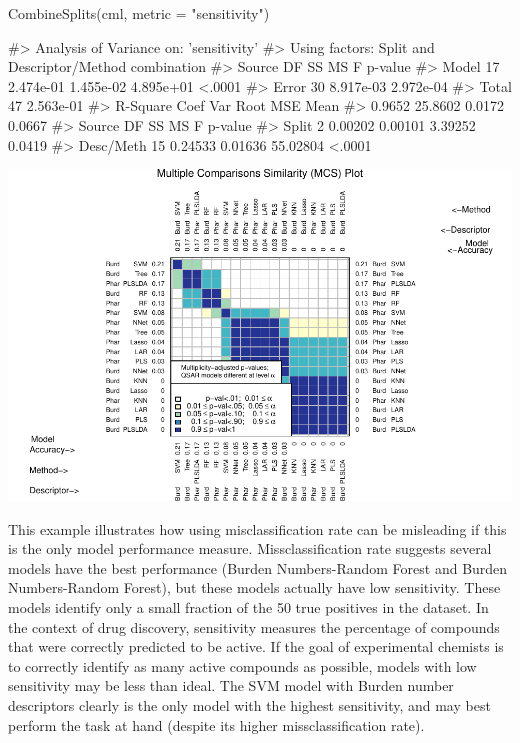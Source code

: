 \begin{Schunk}
\begin{Sinput}
CombineSplits(cml, metric = "sensitivity")
\end{Sinput}
\begin{Soutput}
#>    Analysis of Variance on: 'sensitivity'
#>  Using factors: Split and Descriptor/Method combination
#> Source    DF          SS          MS           F   p-value   
#> Model     17   2.474e-01   1.455e-02   4.895e+01    <.0001   
#> Error     30   8.917e-03   2.972e-04   
#> Total     47   2.563e-01   
#>       R-Square   Coef Var   Root MSE       Mean   
#>         0.9652    25.8602     0.0172     0.0667   
#> Source       DF         SS         MS          F   p-value   
#> Split         2    0.00202    0.00101    3.39252    0.0419   
#> Desc/Meth    15    0.24533    0.01636   55.02804    <.0001
\end{Soutput}

\includegraphics{chemmodlabRJournal_files/figure-latex/CombineSplits_se-1} \end{Schunk}

This example illustrates how using misclassification rate can be
misleading if this is the only model performance measure.
Missclassification rate suggests several models have the best
performance (Burden Numbers-Random Forest and Burden Numbers-Random
Forest), but these models actually have low sensitivity. These models
identify only a small fraction of the 50 true positives in the dataset.
In the context of drug discovery, sensitivity measures the percentage of
compounds that were correctly predicted to be active. If the goal of
experimental chemists is to correctly identify as many active compounds
as possible, models with low sensitivity may be less than ideal. The SVM
model with Burden number descriptors clearly is the only model with the
highest sensitivity, and may best perform the task at hand (despite its
higher missclassification rate).

